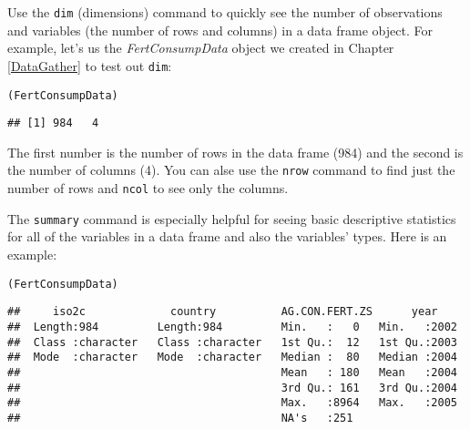 Use the \texttt{dim} (dimensions) command to quickly see the number of observations and variables (the number of rows and columns) in a data frame object. For example, let's us the \emph{FertConsumpData} object we created in Chapter \ref{DataGather} to test out \texttt{dim}:

\begin{knitrout}
\color{fgcolor}\begin{kframe}
\begin{alltt}
(FertConsumpData)
\end{alltt}
\begin{verbatim}
## [1] 984   4
\end{verbatim}
\end{kframe}
\end{knitrout}


\noindent The first number is the number of rows in the data frame (984) and the second is the number of columns (4). You can alse use the \texttt{nrow} command to find just the number of rows and \texttt{ncol} to see only the columns.

The \texttt{summary} command is especially helpful for seeing basic descriptive statistics for all of the variables in a data frame and also the variables' types. Here is an example:

{\small
\begin{knitrout}
\color{fgcolor}\begin{kframe}
\begin{alltt}
(FertConsumpData)
\end{alltt}
\begin{verbatim}
##     iso2c             country          AG.CON.FERT.ZS      year     
##  Length:984         Length:984         Min.   :   0   Min.   :2002  
##  Class :character   Class :character   1st Qu.:  12   1st Qu.:2003  
##  Mode  :character   Mode  :character   Median :  80   Median :2004  
##                                        Mean   : 180   Mean   :2004  
##                                        3rd Qu.: 161   3rd Qu.:2004  
##                                        Max.   :8964   Max.   :2005  
##                                        NA's   :251
\end{verbatim}
\end{kframe}
\end{knitrout}

}

